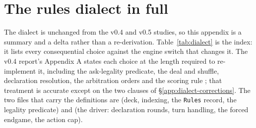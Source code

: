 \section{The rules dialect in full}
\label{app:dialect}

The dialect is unchanged from the v0.4 and v0.5 studies, so this appendix is a
summary and a delta rather than a re-derivation. Table~\ref{tab:dialect} is the
index: it lists every consequential choice against the engine switch that
changes it. The v0.4 report's Appendix A states each choice at the length
required to re-implement it, including the ask-legality predicate, the deal and
shuffle, declaration resolution, the arbitration orders and the scoring rule
\cite{fishbot04}; that treatment is accurate except on the two clauses of
\S\ref{app:dialect-corrections}. The two files that carry the definitions are
 (deck, indexing, the \texttt{Rules} record, the
legality predicate) and  (the driver: declaration
rounds, turn handling, the forced endgame, the action cap).

